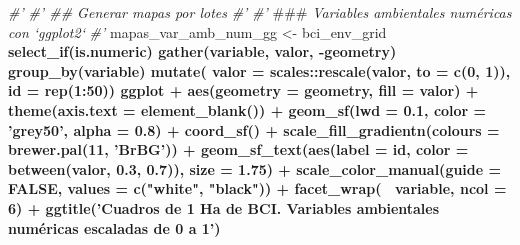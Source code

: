 \documentclass[11pt,]{article}
\newenvironment{Shaded}{\begin{snugshade}}{\end{snugshade}}
\newcommand{\KeywordTok}[1]{\textcolor[rgb]{0.13,0.29,0.53}{\textbf{#1}}}
\newcommand{\DataTypeTok}[1]{\textcolor[rgb]{0.13,0.29,0.53}{#1}}
\newcommand{\DecValTok}[1]{\textcolor[rgb]{0.00,0.00,0.81}{#1}}
\newcommand{\FloatTok}[1]{\textcolor[rgb]{0.00,0.00,0.81}{#1}}
\newcommand{\StringTok}[1]{\textcolor[rgb]{0.31,0.60,0.02}{#1}}
\newcommand{\CommentTok}[1]{\textcolor[rgb]{0.56,0.35,0.01}{\textit{#1}}}
\newcommand{\OtherTok}[1]{\textcolor[rgb]{0.56,0.35,0.01}{#1}}
\newcommand{\OperatorTok}[1]{\textcolor[rgb]{0.81,0.36,0.00}{\textbf{#1}}}
\newcommand{\AlertTok}[1]{\textcolor[rgb]{0.94,0.16,0.16}{#1}}
\newcommand{\NormalTok}[1]{#1}
\begin{document}
\begin{Shaded}
\begin{Highlighting}[]
{{\CommentTok{#' }
\CommentTok{#' ## Generar mapas por lotes}
\CommentTok{#' }
\CommentTok{#' }\AlertTok{###}\CommentTok{ Variables ambientales numéricas con `ggplot2`}
\CommentTok{#' }
\NormalTok{mapas_var_amb_num_gg <-}\StringTok{ }\NormalTok{bci_env_grid }\OperatorTok{%
\StringTok{  }\KeywordTok{select_if}\NormalTok{(is.numeric) }\OperatorTok{%
\StringTok{  }\KeywordTok{gather}\NormalTok{(variable, valor, }\OperatorTok{-}\NormalTok{geometry) }\OperatorTok{%
\StringTok{  }\KeywordTok{group_by}\NormalTok{(variable) }\OperatorTok{%
\StringTok{  }\KeywordTok{mutate}\NormalTok{(}
    \DataTypeTok{valor =}\NormalTok{ scales}\OperatorTok{::}\KeywordTok{rescale}\NormalTok{(valor, }\DataTypeTok{to =} \KeywordTok{c}\NormalTok{(}\DecValTok{0}\NormalTok{, }\DecValTok{1}\NormalTok{)),}
    \DataTypeTok{id =} \KeywordTok{rep}\NormalTok{(}\DecValTok{1}\OperatorTok{:}\DecValTok{50}\NormalTok{)) }\OperatorTok{%
\StringTok{  }\NormalTok{ggplot }\OperatorTok{+}
\StringTok{  }\KeywordTok{aes}\NormalTok{(}\DataTypeTok{geometry =}\NormalTok{ geometry, }\DataTypeTok{fill =}\NormalTok{ valor) }\OperatorTok{+}
\StringTok{  }\KeywordTok{theme}\NormalTok{(}\DataTypeTok{axis.text =} \KeywordTok{element_blank}\NormalTok{()) }\OperatorTok{+}
\StringTok{  }\KeywordTok{geom_sf}\NormalTok{(}\DataTypeTok{lwd =} \FloatTok{0.1}\NormalTok{, }\DataTypeTok{color =} \StringTok{'grey50'}\NormalTok{, }\DataTypeTok{alpha =} \FloatTok{0.8}\NormalTok{) }\OperatorTok{+}\StringTok{ }\KeywordTok{coord_sf}\NormalTok{() }\OperatorTok{+}
\StringTok{  }\KeywordTok{scale_fill_gradientn}\NormalTok{(}\DataTypeTok{colours =} \KeywordTok{brewer.pal}\NormalTok{(}\DecValTok{11}\NormalTok{, }\StringTok{'BrBG'}\NormalTok{)) }\OperatorTok{+}
\StringTok{  }\KeywordTok{geom_sf_text}\NormalTok{(}\KeywordTok{aes}\NormalTok{(}\DataTypeTok{label =}\NormalTok{ id, }\DataTypeTok{color =} \KeywordTok{between}\NormalTok{(valor, }\FloatTok{0.3}\NormalTok{, }\FloatTok{0.7}\NormalTok{)), }\DataTypeTok{size =} \FloatTok{1.75}\NormalTok{) }\OperatorTok{+}
\StringTok{  }\KeywordTok{scale_color_manual}\NormalTok{(}\DataTypeTok{guide =} \OtherTok{FALSE}\NormalTok{, }\DataTypeTok{values =} \KeywordTok{c}\NormalTok{(}\StringTok{"white"}\NormalTok{, }\StringTok{"black"}\NormalTok{)) }\OperatorTok{+}
\StringTok{  }\KeywordTok{facet_wrap}\NormalTok{(}\OperatorTok{~}\StringTok{ }\NormalTok{variable, }\DataTypeTok{ncol =} \DecValTok{6}\NormalTok{) }\OperatorTok{+}\StringTok{ }
\StringTok{  }\KeywordTok{ggtitle}\NormalTok{(}\StringTok{'Cuadros de 1 Ha de BCI. Variables ambientales numéricas escaladas de 0 a 1'}\NormalTok{)}
}}}}}}}
\end{Highlighting}
\end{Shaded}
\end{document}
